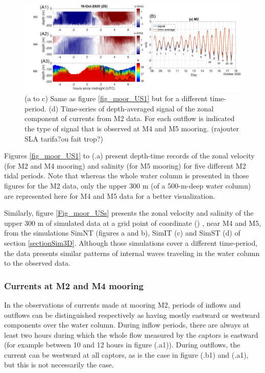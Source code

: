 \begin{figure}[!h]
 \includegraphics[width=\textwidth]{./GBR3D/US_moorings3.png}
 \caption {(a to c) Same as figure \ref{fig_moor_US1} but for a different time-period. (d) Time-series of depth-averaged signal of the zonal component of currents from M2 data.  \color{blue}For each outflow \color{black} is indicated the type of signal that is observed at M4 and M5 mooring. \color{green}(rajouter SLA tarifa?ou fait trop?) \color{black}}
 \label{fig_moor_US3}
\end{figure}

Figures \ref{fig_moor_US1} to (.a) present depth-time records of the zonal velocity (for M2 and M4 mooring) and salinity (for M5 mooring) for five different M2 tidal periods. Note that \color{blue} whereas the whole  \color{black}water column is presented in those figures for the M2 data, only the upper 300 m (of a 500-m-deep water column) are represented here for M4 and M5 data for a better visualization.

Similarly, figure \ref{Fig_moor_USs} presents the zonal velocity and salinity of the upper 300 m of simulated data at a grid point of coordinate  \color{green}() \color{black}, near M4 and M5, from the simulations SimNT (figures a and b), SimIT (c) and SimST (d) of section \ref{sectionSim3D}. Although those simulations cover a different time-period, the data presents similar patterns of internal waves traveling in the water column to the observed data.


\subsubsection{Currents at M2 and M4 mooring}

In the  \color{blue}observations of currents made at mooring M2\color{black}, periods of inflows and outflows can be distinguished respectively as having mostly eastward or westward components over the water column. During inflow periods, there are always at least two hours during which the whole flow measured by the captors is eastward (for example between 10 and 12 hours in figure (.a1)). During outflows, the current can be westward at all captors, as is the case in figure (.b1) and (.a1), but this is not necessarily the case. 

